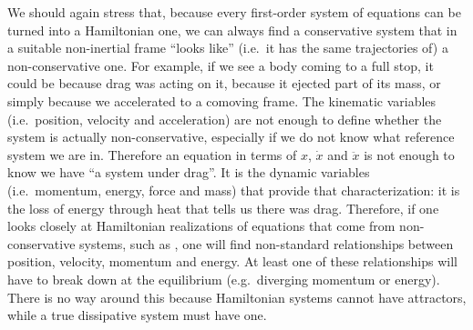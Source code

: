\documentclass[11pt]{article}
\begin{document}
We should again stress that, because every first-order system of equations can be turned into a Hamiltonian one\cite{AllSystemsAreHam}, we can always find a conservative system that in a suitable non-inertial frame ``looks like'' (i.e.~it has the same trajectories of) a non-conservative one. For example, if we see a body coming to a full stop, it could be because drag was acting on it, because it ejected part of its mass, or simply because we accelerated to a comoving frame. The kinematic variables (i.e.~position, velocity and acceleration) are not enough to define whether the system is actually non-conservative, especially if we do not know what reference system we are in. Therefore an equation in terms of $x$, $\dot{x}$ and $\ddot{x}$ is not enough to know we have ``a system under drag''. It is the dynamic variables (i.e.~momentum, energy, force and mass) that provide that characterization: it is the loss of energy through heat that tells us there was drag. Therefore, if one looks closely at Hamiltonian realizations of equations that come from non-conservative systems, such as \cite{chandrasekar2007lagrangian}, one will find non-standard relationships between position, velocity, momentum and energy. At least one of these relationships will have to break down at the equilibrium (e.g.~diverging momentum or energy). There is no way around this because Hamiltonian systems cannot have attractors, while a true dissipative system must have one.



{}
\end{document}
